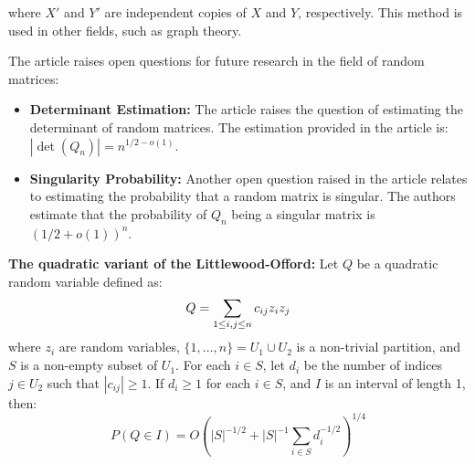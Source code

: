 where \( X' \) and \( Y' \) are independent copies of \( X \) and \( Y \), respectively. This method is used in other fields, such as graph theory.
\vspace{\baselineskip}

The article raises open questions for future research in the field of random matrices:

\begin{itemize}
    \item \textbf{Determinant Estimation:} The article raises the question of estimating the determinant of random matrices. The estimation provided in the article is: \( |\det(Q_n)| = n^{1/2-o(1)} \).
    \item \textbf{Singularity Probability:} Another open question raised in the article relates to estimating the probability that a random matrix is singular. The authors estimate that the probability of \( Q_n \) being a singular matrix is \( (1/2+o(1))^n \).
\end{itemize}

\vspace{\baselineskip}
\textbf{The quadratic variant of the Littlewood-Offord:}
Let \( Q \) be a quadratic random variable defined as:
\vspace{-0.8\baselineskip}
\[ Q = \sum_{1 \leq i,j \leq n} c_{ij} z_i z_j \vspace{-0.5\baselineskip} \]
where \( z_i \) are random variables, \( \{1,\ldots,n\} = U_1 \cup U_2 \) is a non-trivial partition, and \( S \) is a non-empty subset of \( U_1 \). For each \( i \in S \), let \( d_i \) be the number of indices \( j \in U_2 \) such that \( |c_{ij}| \geq 1 \). If \( d_i \geq 1 \) for each \( i \in S \), and \( I \) is an interval of length 1, then:
\vspace{-0.9\baselineskip}
\[ P(Q \in I) = O\left( |S|^{-1/2} + |S|^{-1} \sum_{i \in S} d_i^{-1/2} \right)^{1/4} \]


